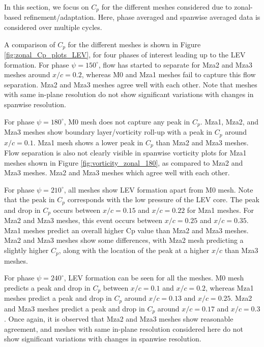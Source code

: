 
In this section, we focus on $C_p$ for the different meshes considered due to zonal-based refinement/adaptation.
Here, phase averaged and spanwise averaged data is considered over multiple cycles.

A comparison of $C_p$ for the different meshes is shown in Figure \ref{fig:zonal_Cp_plots_LEV}, for four phases of interest leading up to the LEV formation. 
For phase $\psi=150^\circ$, flow has started to separate for Mza2 and Mza3 meshes around $x/c = 0.2$, whereas M0 and Mza1 meshes fail to capture this flow separation. 
Mza2 and Mza3 meshes agree well with each other. 
Note that meshes with same in-plane resolution do not show significant variations with changes in spanwise resolution.

 
For phase $\psi=180^\circ$, M0 mesh does not capture any peak in $C_p$.
Mza1, Mza2, and Mza3 meshes show boundary layer/vorticity roll-up with a peak in $C_p$ around $x/c = 0.1$.
Mza1 mesh shows a lower peak in $C_p$ than Mza2 and Mza3 meshes. 
Flow separation is also not clearly visible in spanwise vorticity plots for Mza1 meshes shown in Figure \ref{fig:vorticity_zonal_180}, as compared to Mza2 and Mza3 meshes.
Mza2 and Mza3 meshes which agree well with each other.


For phase $\psi=210^\circ$, all meshes show LEV formation apart from M0 mesh. Note that the peak in $C_p$ corresponds with the low pressure of the LEV core.
The peak and drop in $C_p$ occurs between $x/c=0.15$ and $x/c=0.22$ for Mza1 meshes. 
For Mza2 and Mza3 meshes, this event occurs between $x/c=0.25$ and $x/c=0.35$. Mza1 meshes predict an overall higher Cp value than Mza2 and Mza3 meshes.
Mza2 and Mza3 meshes show some differences, with Mza2 mesh predicting a slightly higher $C_p$, along with the location of the peak at a higher $x/c$ than Mza3 meshes.

For phase $\psi=240^\circ$, LEV formation can be seen for all the meshes.
M0 mesh predicts a peak and drop in $C_p$ between $x/c=0.1$ and $x/c=0.2$, whereas Mza1 meshes predict a peak and drop in $C_p$ around $x/c=0.13$ and $x/c=0.25$. 
Mza2 and Mza3 meshes predict a peak and drop in $C_p$ around $x/c=0.17$ and $x/c=0.3$. 
Once again, it is observed that Mza2 and Mza3 meshes show reasonable agreement, and meshes with same in-plane resolution considered here do not show significant variations with changes in spanwise resolution.



